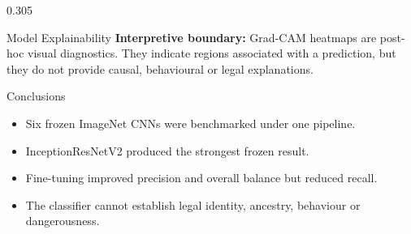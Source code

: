 \documentclass[final]{beamer}
\begin{document}
\begin{frame}[t]
\begin{columns}[t,totalwidth=0.98\paperwidth]
\begin{column}{0.305\paperwidth}
\begin{block}{Model Explainability}
\textbf{Interpretive boundary:}
Grad-CAM heatmaps are post-hoc visual diagnostics. They indicate
regions associated with a prediction, but they do not provide causal,
behavioural or legal explanations.

\end{block}

\begin{block}{Conclusions}

\begin{itemize}
  \setlength{\itemsep}{0.18em}
  \setlength{\parskip}{0pt}

  \item Six frozen ImageNet CNNs were benchmarked under one pipeline.

  \item InceptionResNetV2 produced the strongest frozen result.

  \item Fine-tuning improved precision and overall balance but reduced recall.

  \item The classifier cannot establish legal identity, ancestry,
  behaviour or dangerousness.

\end{itemize}

\end{block}

\end{column}

\end{columns}

\end{frame}
\end{document}
